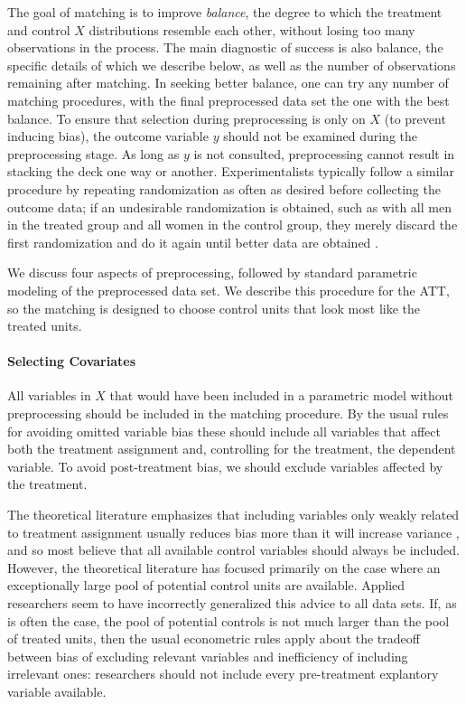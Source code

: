 \documentclass[11pt,titlepage]{article}
\begin{document}
The goal of matching is to improve \emph{balance}, the degree to which
the treatment and control $X$ distributions resemble each other,
without losing too many observations in the process.  The main
diagnostic of success is also balance, the specific details of which
we describe below, as well as the number of observations remaining
after matching.  In seeking better balance, one can try any number of
matching procedures, with the final preprocessed data set the one with
the best balance.  To ensure that selection during preprocessing is
only on $X$ (to prevent inducing bias), the outcome variable $y$
should not be examined during the preprocessing stage.  As long as $y$
is not consulted, preprocessing cannot result in stacking the deck one
way or another.  Experimentalists typically follow a similar procedure
by repeating randomization as often as desired before collecting the
outcome data; if an undesirable randomization is obtained, such as
with all men in the treated group and all women in the control group,
they merely discard the first randomization and do it again until
better data are obtained \citep[see][]{Rubin01}.

We discuss four aspects of preprocessing, followed by standard
parametric modeling of the preprocessed data set.  We describe this
procedure for the ATT, so the matching is designed to choose control
units that look most like the treated units.

\paragraph{Selecting Covariates}
All variables in $X$ that would have been included in a parametric
model without preprocessing should be included in the matching
procedure.  By the usual rules for avoiding omitted variable bias
these should include all variables that affect both the treatment
assignment and, controlling for the treatment, the dependent variable.
To avoid post-treatment bias, we should exclude variables affected by
the treatment.  

The theoretical literature emphasizes that including variables only
weakly related to treatment assignment usually reduces bias more than
it will increase variance \citep{RubTho96, HecIchSmi98}, and so most
believe that all available control variables should always be
included.  However, the theoretical literature has focused primarily
on the case where an exceptionally large pool of potential control
units are available.  Applied researchers seem to have incorrectly
generalized this advice to all data sets.  If, as is often the case,
the pool of potential controls is not much larger than the pool of
treated units, then the usual econometric rules apply about the
tradeoff between bias of excluding relevant variables and inefficiency
of including irrelevant ones: researchers should not include every
pre-treatment explantory variable available.
\end{document}
